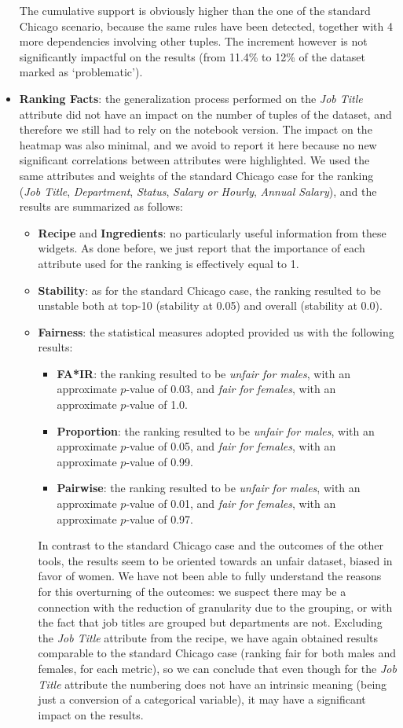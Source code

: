 \begin{itemize}
The cumulative support is obviously higher than the one of the standard Chicago scenario, because the same rules have been detected, together with 4 more dependencies involving other tuples. The increment however is not significantly impactful on the results (from 11.4\% to 12\% of the dataset marked as `problematic').
\item \textbf{Ranking Facts}: the generalization process performed on the \textit{Job Title} attribute did not have an impact on the number of tuples of the dataset, and therefore we still had to rely on the notebook version. The impact on the heatmap was also minimal, and we avoid to report it here because no new significant correlations between attributes were highlighted. We used the same attributes and weights of the standard Chicago case for the ranking (\textit{Job Title}, \textit{Department}, \textit{Status}, \textit{Salary or Hourly}, \textit{Annual Salary}), and the results are summarized as follows:
\begin{itemize}
\item \textbf{Recipe} and \textbf{Ingredients}: no particularly useful information from these widgets. As done before, we just report that the importance of each attribute used for the ranking is effectively equal to 1.
\item \textbf{Stability}: as for the standard Chicago case, the ranking resulted to be unstable both at top-10 (stability at 0.05) and overall (stability at 0.0).
\item \textbf{Fairness}: the statistical measures adopted provided us with the following results:
\begin{itemize}
\item \textbf{FA*IR}: the ranking resulted to be \textit{unfair for males}, with an approximate \(p\)-value of 0.03, and \textit{fair for females}, with an approximate \(p\)-value of 1.0.
\item \textbf{Proportion}: the ranking resulted to be \textit{unfair for males}, with an approximate \(p\)-value of 0.05, and \textit{fair for females}, with an approximate \(p\)-value of 0.99.
\item \textbf{Pairwise}: the ranking resulted to be \textit{unfair for males}, with an approximate \(p\)-value of 0.01, and \textit{fair for females}, with an approximate \(p\)-value of 0.97.
\end{itemize}
In contrast to the standard Chicago case and the outcomes of the other tools, the results seem to be oriented towards an unfair dataset, biased in favor of women. We have not been able to fully understand the reasons for this overturning of the outcomes: we suspect there may be a connection with the reduction of granularity due to the grouping, or with the fact that job titles are grouped but departments are not. Excluding the \textit{Job Title} attribute from the recipe, we have again obtained results comparable to the standard Chicago case (ranking fair for both males and females, for each metric), so we can conclude that even though for the \textit{Job Title} attribute the numbering does not have an intrinsic meaning (being just a conversion of a categorical variable), it may have a significant impact on the results.

\end{itemize}
\end{itemize}
